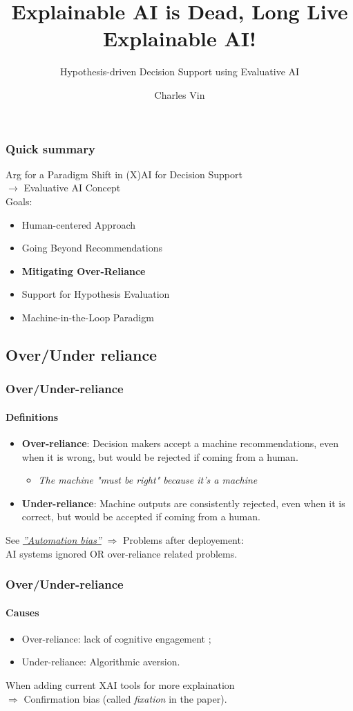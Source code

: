 \documentclass[compress,12pt]{beamer}
\title{Explainable AI is Dead, Long Live Explainable AI!}
\subtitle{Hypothesis-driven Decision Support using Evaluative AI}
\date{}
\author{\tiny Charles Vin}
\institute{\tiny Sorbonne Université - 21216136}
\begin{document}
\frame[plain]{\titlepage}

\begin{frame}
      \frametitle{Quick summary}
      Arg for a Paradigm Shift in (X)AI for Decision Support \\
      $\rightarrow$ Evaluative AI Concept \\
      Goals:
      \begin{itemize}
            \item Human-centered Approach
            \item Going Beyond Recommendations
            \item \textbf{Mitigating Over-Reliance}
            \item Support for Hypothesis Evaluation
            \item Machine-in-the-Loop Paradigm
      \end{itemize}
\end{frame}

\subsection{Over/Under reliance}
\begin{frame}
      \frametitle{Over/Under-reliance}
      \framesubtitle{Definitions}
      \begin{itemize}
            \item \textbf{Over-reliance}: Decision makers accept a machine recommendations, even when it is wrong, but would be rejected if coming from a human. \begin{itemize}
                  \item \textit{The machine "must be right" because it's a machine}
            \end{itemize}
            \item \textbf{Under-reliance}: Machine outputs are consistently rejected, even when it is correct, but would be accepted if coming from a human. 
      \end{itemize}
      See \href{https://en.wikipedia.org/wiki/Automation_bias}{\textit{''Automation bias''}}
      $ \Rightarrow  $ Problems after deployement: \\ 
      AI systems ignored OR over-reliance related problems.
\end{frame}

\begin{frame}
      \frametitle{Over/Under-reliance}
      \framesubtitle{Causes}
      \begin{itemize}
            \item Over-reliance: lack of cognitive engagement ;
            \item Under-reliance: Algorithmic aversion.
      \end{itemize}
      When adding current XAI tools for more explaination \\
      $ \Rightarrow $ Confirmation bias (called \textit{fixation} in the paper).
\end{frame}
\end{document}
